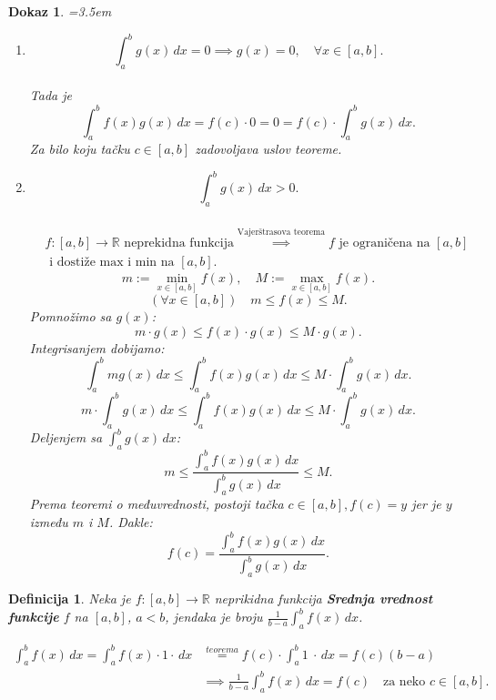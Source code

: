 \documentclass[11pt]{article}
\newcounter{mathitem}
\theoremstyle{plain}
\newtheorem{definicija}[mathitem]{Definicija}
\theoremstyle{serbnodot}
\newtheorem*{dokaz}{Dokaz}
\begin{document}
\begin{dokaz} \quad
    \par\hangindent=3.5em
    \begin{enumerate}
      \item \[ \int_{a}^{b} g(x) \, dx = 0 \implies g(x) = 0, \quad \forall x \in [a,b]. \] \\
      Tada je \[ \int_{a}^{b} f(x) g(x) \, dx = f(c) \cdot 0 = 0 = f(c) \cdot \int_{a}^{b} g(x) \, dx. \] Za bilo koju tačku \( c \in [a,b] \) zadovoljava uslov teoreme.
      \item \[ \int_{a}^{b} g(x) \, dx > 0. \] \\
      \[
        \begin{aligned}
        &f:[a,b]\to\mathbb{R} \text{ neprekidna funkcija}
        \overset{\text{Vajerštrasova teorema}}{\implies}
        f \text{ je ograničena na } [a,b] \\
        &\text{ i dostiže max i min na } [a,b].
        \end{aligned}
      \]
      \[
        m := \min_{x \in [a,b]} f(x), \quad M := \max_{x \in [a,b]} f(x).
      \]
      \[ (\forall x \in [a,b]) \quad m \leq f(x) \leq M. \]
      Pomnožimo sa \( g(x) \):
      \[ m \cdot g(x) \leq f(x) \cdot g(x) \leq M \cdot g(x). \]
      Integrisanjem dobijamo:
      \[
        \int_{a}^{b} m g(x) \, dx \leq \int_{a}^{b} f(x) g(x) \, dx \leq M \cdot \int_{a}^{b} g(x) \, dx. 
      \]
      \[
        m \cdot \int_{a}^{b} g(x) \, dx \leq \int_{a}^{b} f(x) g(x) \, dx \leq M \cdot \int_{a}^{b} g(x) \, dx.
      \]
      Deljenjem sa \( \int_{a}^{b} g(x) \, dx \):
      \[
        m \leq \frac{\int_{a}^{b} f(x) g(x) \, dx}{\int_{a}^{b} g(x) \, dx} \leq M.
      \]
      Prema teoremi o međuvrednosti, postoji tačka \( c \in [a,b], f(c) = y \) jer je \( y \) između \( m \) i \( M \). Dakle:
      \[
        f(c) = \frac{\int_{a}^{b} f(x) g(x) \, dx}{\int_{a}^{b} g(x) \, dx}.
      \]
    \end{enumerate}
\end{dokaz}

\begin{definicija}
  
  Neka je \( f:[a, b] \to \mathbb{R} \) neprikidna funkcija \textbf{Srednja vrednost funkcije} \(f\)
  na \([a, b]\), \(a < b\), jendaka je broju  \(\frac{1}{b-a}\int_{a}^{b}f(x)\, dx\).

\end{definicija}
\begin{align*}
  \int_{a}^{b} f(x) \,dx = \int_{a}^{b} f(x) \cdot 1 \cdot \,dx &\overset{teorema}{=}
  f(c) \cdot \int_{a}^{b} 1 \ \cdot \,dx = f(c)(b-a) \\
  &\implies \frac{1}{b-a} \int_{a}^{b} f(x)\,dx = f(c) \quad \text{za neko } c \in [a, b].
\end{align*}
\end{document}
